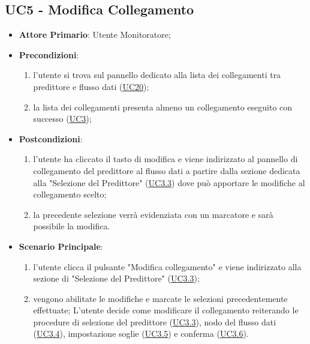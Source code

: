 	\label{par:UC5}
	\subsection{UC5 - Modifica Collegamento}

		\begin{itemize}
			\item\textbf{Attore Primario}: Utente Monitoratore;
			\item\textbf{Precondizioni}: 
				\begin{enumerate}
					\item l'utente si trova sul pannello dedicato alla lista dei collegamenti tra predittore e flusso dati (\hyperref[par:UC20]{UC20});
					\item la lista dei collegamenti presenta almeno un collegamento eseguito con successo (\hyperref[par:UC3]{UC3});
				\end{enumerate}
			\item\textbf{Postcondizioni}: 
				\begin{enumerate}
					\item l’utente ha cliccato il tasto di modifica e viene indirizzato al pannello di collegamento del predittore al flusso dati a partire dalla sezione dedicata alla "Selezione del Predittore" (\hyperref[par:UC3.3]{UC3.3}) dove può apportare le modifiche al collegamento scelto; 
					\item la precedente selezione verrà evidenziata con un marcatore e sarà possibile la modifica.
				\end{enumerate}
			\item\textbf{Scenario Principale}: 
				\begin{enumerate} 
					\item l'utente clicca il pulsante "Modifica collegamento" e viene indirizzato alla sezione di "Selezione del Predittore" (\hyperref[par:UC3.3]{UC3.3});  
					\item vengono abilitate le modifiche e marcate le selezioni precedentemente effettuate; L'utente decide come modificare il collegamento reiterando le procedure di selezione del predittore (\hyperref[par:UC3.3]{UC3.3}), nodo del flusso dati (\hyperref[par:UC3.4]{UC3.4}), impostazione soglie (\hyperref[par:UC3.5]{UC3.5}) e conferma (\hyperref[par:UC3.6]{UC3.6}). 
				\end{enumerate}		
		\end{itemize}



	\label{par:UC6}

